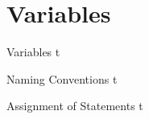 \documentclass[../lecture2-variables.tex]{subfiles}
\begin{document}
\section{Variables}


\begin{frame}[fragile]{Variables}
t
\end{frame}


\begin{frame}[fragile]{Naming Conventions}
t
\end{frame}


\begin{frame}[fragile]{Assignment of Statements}
t
\end{frame}

\end{document}
